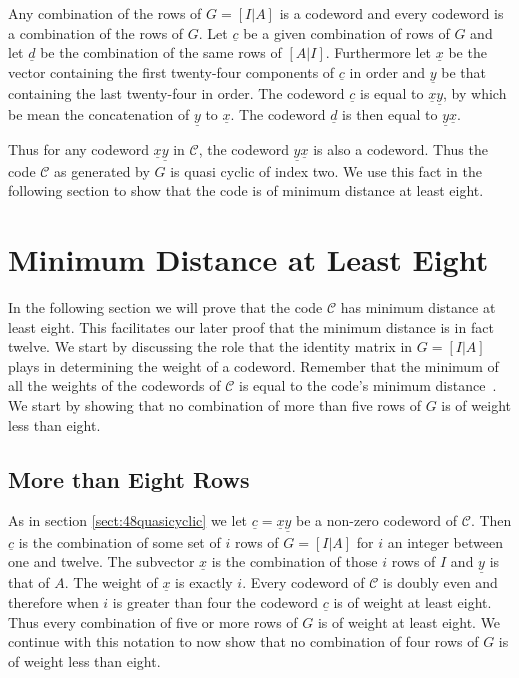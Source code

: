 Any combination of the rows of $G=[I|A]$ is a codeword and every codeword is a combination of the rows of $G$.
Let $\underline{c}$ be a given combination of rows of $G$ and let $\underline{d}$ be the combination of the same rows of $[A|I]$.
Furthermore let $\underline{x}$ be the vector containing the first twenty-four components of $\underline{c}$ in order and $\underline{y}$ be that containing the last twenty-four in order.
The codeword $\underline{c}$ is equal to $\underline{x} \underline{y}$, by which be mean the concatenation of $\underline{y}$ to $\underline{x}$.
The codeword $\underline{d}$ is then equal to $\underline{y} \underline{x}$.

Thus for any codeword $\underline{x}\underline{y}$ in $\mathcal{C}$, the codeword $\underline{y} \underline{x}$ is also a codeword.
Thus the code $\mathcal{C}$ as generated by $G$ is quasi cyclic of index two.
We use this fact in the following section to show that the code is of minimum distance at least eight.

\section{Minimum Distance at Least Eight}
In the following section we will prove that the code $\mathcal{C}$ has minimum distance at least eight.
This facilitates our later proof that the minimum distance is in fact twelve.
We start by discussing the role that the identity matrix in $G=[I|A]$ plays in determining the weight of a codeword.
Remember that the minimum of all the weights of the codewords of $\mathcal{C}$ is equal to the code's minimum distance~\cite[p.~8]{huf03}.
We start by showing that no combination of more than five rows of $G$ is of weight less than eight.

\subsection{More than Eight Rows}
As in section \ref{sect:48quasicyclic} we let $\underline{c} = \underline{x} \underline{y}$ be a non-zero codeword of $\mathcal{C}$.
Then $\underline{c}$ is the combination of some set of $i$ rows of $G = [I|A]$ for $i$ an integer between one and twelve.
The subvector $\underline{x}$ is the combination of those $i$ rows of $I$ and $\underline{y}$ is that of $A$.
The weight of $\underline{x}$ is exactly $i$.
Every codeword of $\mathcal{C}$ is doubly even and therefore when $i$ is greater than four the codeword $\underline{c}$ is of weight at least eight.
Thus every combination of five or more rows of $G$ is of weight at least eight.
We continue with this notation to now show that no combination of four rows of $G$ is of weight less than eight.

